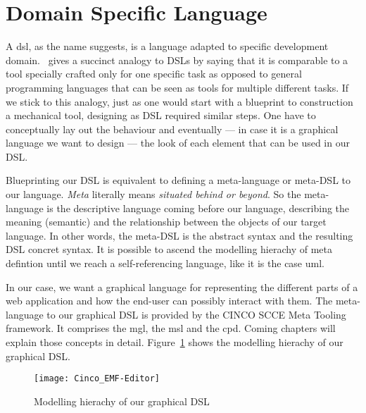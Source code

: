 \section[DSL]{Domain Specific Language}

A \acrfull{dsl}, as the name suggests, is a language adapted to specific development domain.~\cite{Naujokat2018} gives a succinct analogy to DSLs by saying that it is comparable to a tool specially crafted only for one specific task as opposed to general programming languages that can be seen as tools for multiple different tasks. If we stick to this analogy, just as one would start with a blueprint to construction a mechanical tool, designing as DSL required similar steps. One have to conceptually lay out the behaviour and eventually --- in case it is a graphical language we want to design --- the look of each element that can be used in our DSL\@.

Blueprinting our DSL is equivalent to defining a meta-language or meta-DSL to our language. \textit{Meta} literally means \textit{situated behind or beyond}. So the meta-language is the descriptive language coming before our language, describing the meaning (semantic) and the relationship between the objects of our target language. In other words, the meta-DSL is the abstract syntax and the resulting DSL concret syntax. It is possible to ascend the modelling hierachy of meta defintion until we reach a self-referencing language, like it is the case \acrfull{uml}.

In our case, we want a graphical language for representing the different parts of a web application and how the end-user can possibly interact with them. The meta-language to our graphical DSL is provided by the CINCO SCCE Meta Tooling framework. It comprises the \acrfull{mgl}, the \acrfull{msl} and the \acrfull{cpd}. Coming chapters will explain those concepts in detail. Figure~\ref{fig:modelling-hierachy} shows the modelling hierachy of our graphical DSL\@.

\begin{figure}[h]
    \texttt{[image: Cinco\_EMF-Editor]}
    \caption{Modelling hierachy of our graphical DSL}\label{fig:modelling-hierachy}
\end{figure}